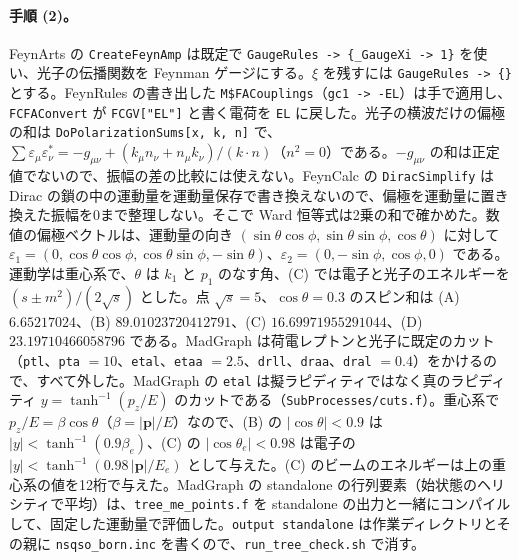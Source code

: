 \documentclass[a4paper,10pt]{ltjsarticle}
\begin{document}
\paragraph{手順 (2)。}FeynArts の \texttt{CreateFeynAmp} は既定で \texttt{GaugeRules -> \{\_GaugeXi -> 1\}} を使い、光子の伝播関数を Feynman ゲージにする。$\xi$ を残すには \texttt{GaugeRules -> \{\}} とする。FeynRules の書き出した \texttt{M\$FACouplings}（\texttt{gc1 -> -EL}）は手で適用し、\texttt{FCFAConvert} が \texttt{FCGV["EL"]} と書く電荷を \texttt{EL} に戻した。光子の横波だけの偏極の和は \texttt{DoPolarizationSums[x, k, n]} で、$\sum\varepsilon_\mu\varepsilon^*_\nu=-g_{\mu\nu}+(k_\mu n_\nu+n_\mu k_\nu)/(k\cdot n)$（$n^2=0$）である。$-g_{\mu\nu}$ の和は正定値でないので、振幅の差の比較には使えない。FeynCalc の \texttt{DiracSimplify} は Dirac の鎖の中の運動量を運動量保存で書き換えないので、偏極を運動量に置き換えた振幅を0まで整理しない。そこで Ward 恒等式は2乗の和で確かめた。数値の偏極ベクトルは、運動量の向き $(\sin\theta\cos\phi,\sin\theta\sin\phi,\cos\theta)$ に対して $\varepsilon_1=(0,\cos\theta\cos\phi,\cos\theta\sin\phi,-\sin\theta)$、$\varepsilon_2=(0,-\sin\phi,\cos\phi,0)$ である。運動学は重心系で、$\theta$ は $k_1$ と $p_1$ のなす角、(C) では電子と光子のエネルギーを $(s\pm m^2)/(2\sqrt s)$ とした。点 $\sqrt s=5$、$\cos\theta=0.3$ のスピン和は (A) $6.65217024$、(B) $89.01023720412791$、(C) $16.69971955291044$、(D) $23.19710466058796$ である。MadGraph は荷電レプトンと光子に既定のカット（\texttt{ptl}、\texttt{pta} $=10$、\texttt{etal}、\texttt{etaa} $=2.5$、\texttt{drll}、\texttt{draa}、\texttt{dral} $=0.4$）をかけるので、すべて外した。MadGraph の \texttt{etal} は擬ラピディティではなく真のラピディティ $y=\tanh^{-1}(p_z/E)$ のカットである（\texttt{SubProcesses/cuts.f}）。重心系で $p_z/E=\beta\cos\theta$（$\beta=|\boldsymbol p|/E$）なので、(B) の $|\cos\theta|<0.9$ は $|y|<\tanh^{-1}(0.9\beta_e)$、(C) の $|\cos\theta_e|<0.98$ は電子の $|y|<\tanh^{-1}(0.98\,|\boldsymbol p|/E_e)$ として与えた。(C) のビームのエネルギーは上の重心系の値を12桁で与えた。MadGraph の standalone の行列要素（始状態のヘリシティで平均）は、\texttt{tree\_me\_points.f} を standalone の出力と一緒にコンパイルして、固定した運動量で評価した。\texttt{output standalone} は作業ディレクトリとその親に \texttt{nsqso\_born.inc} を書くので、\texttt{run\_tree\_check.sh} で消す。
\end{document}
